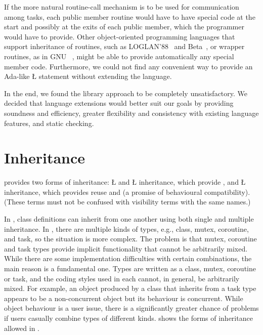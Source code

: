 \documentclass[openright,twoside]{report}
\begin{document}
If the more natural routine-call mechanism is to be used for communication among tasks, each public member routine would have to have special code at the start and possibly at the exits of each public member, which the programmer would have to provide.
Other object-oriented programming languages that support inheritance of routines, such as LOGLAN'88~\cite{LOGLAN88} and Beta~\cite{Beta}, or wrapper routines, as in GNU \CC~\cite{Tiemann88}, might be able to provide automatically any special member code.
Furthermore, we could not find any convenient way to provide an Ada-like \LGinlinetrue\LGbegin\lgrinde\L{}\endlgrinde\LGend{} statement without extending the language.

In the end, we found the library approach to be completely unsatisfactory.
We decided that language extensions would better suit our goals by providing soundness and efficiency, greater flexibility and consistency with existing language features, and static checking.


\section{Inheritance}
\label{s:Inheritance}

\CC provides two forms of inheritance:
\LGinlinetrue\LGbegin\lgrinde\L{}\endlgrinde\LGend{} and \LGinlinetrue\LGbegin\lgrinde\L{}\endlgrinde\LGend{} inheritance, which provide , and \LGinlinetrue\LGbegin\lgrinde\L{}\endlgrinde\LGend{} inheritance, which provides reuse and  (a promise of behavioural compatibility).
(These terms must not be confused with \CC visibility terms with the same names.)

In \CC, class definitions can inherit from one another using both single and multiple inheritance.
In \uC, there are multiple kinds of types, e.g., class, mutex, coroutine, and task, so the situation is more complex.
The problem is that mutex, coroutine and task types provide implicit functionality that cannot be arbitrarily mixed.
While there are some implementation difficulties with certain combinations, the main reason is a fundamental one.
Types are written as a class, mutex, coroutine or task, and the coding styles used in each cannot, in general, be arbitrarily mixed.
For example, an object produced by a class that inherits from a task type appears to be a non-concurrent object but its behaviour is concurrent.
While object behaviour is a user issue, there is a significantly greater chance of problems if users casually combine types of different kinds.
 shows the forms of inheritance allowed in \uC.
\end{document}
